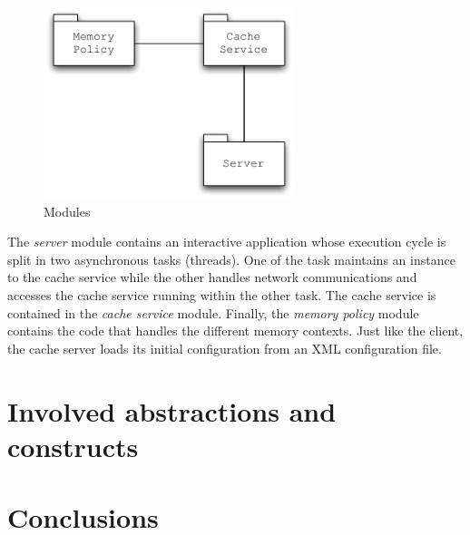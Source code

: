 \documentclass[11pt,a4paper]{article}
\begin{document}
\begin{figure}
\begin{center}
\includegraphics[width=0.65\textwidth]{figures/Server-Modules.pdf}
\caption{Modules}
\label{figure:server-modules}
\end{center}
\end{figure}

The \textit{server} module contains an interactive application whose execution cycle is split in two asynchronous tasks (threads). One of the task maintains an instance to the cache service while the other handles network communications and accesses the cache service running within the other task. The cache service is contained in the \textit{cache service} module. Finally, the \textit{memory policy} module contains the code that handles the different memory contexts. Just like the client, the cache server loads its initial configuration from an XML configuration file.

\section{Involved abstractions and constructs}
\label{section:functionalities}

\section{Conclusions}
\label{section:conclusions}
\end{document}

